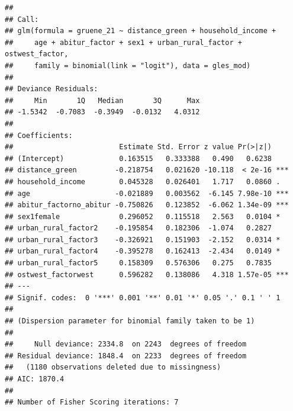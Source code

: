 \documentclass[
]{article}
\begin{document}
\begin{verbatim}
## 
## Call:
## glm(formula = gruene_21 ~ distance_green + household_income + 
##     age + abitur_factor + sex1 + urban_rural_factor + ostwest_factor, 
##     family = binomial(link = "logit"), data = gles_mod)
## 
## Deviance Residuals: 
##     Min       1Q   Median       3Q      Max  
## -1.5342  -0.7083  -0.3949  -0.0132   4.0312  
## 
## Coefficients:
##                         Estimate Std. Error z value Pr(>|z|)    
## (Intercept)             0.163515   0.333388   0.490   0.6238    
## distance_green         -0.218754   0.021620 -10.118  < 2e-16 ***
## household_income        0.045328   0.026401   1.717   0.0860 .  
## age                    -0.021889   0.003562  -6.145 7.98e-10 ***
## abitur_factorno_abitur -0.750826   0.123852  -6.062 1.34e-09 ***
## sex1female              0.296052   0.115518   2.563   0.0104 *  
## urban_rural_factor2    -0.195854   0.182306  -1.074   0.2827    
## urban_rural_factor3    -0.326921   0.151903  -2.152   0.0314 *  
## urban_rural_factor4    -0.395278   0.162413  -2.434   0.0149 *  
## urban_rural_factor5     0.158309   0.576306   0.275   0.7835    
## ostwest_factorwest      0.596282   0.138086   4.318 1.57e-05 ***
## ---
## Signif. codes:  0 '***' 0.001 '**' 0.01 '*' 0.05 '.' 0.1 ' ' 1
## 
## (Dispersion parameter for binomial family taken to be 1)
## 
##     Null deviance: 2334.8  on 2243  degrees of freedom
## Residual deviance: 1848.4  on 2233  degrees of freedom
##   (1180 observations deleted due to missingness)
## AIC: 1870.4
## 
## Number of Fisher Scoring iterations: 7
\end{verbatim}
\end{document}
